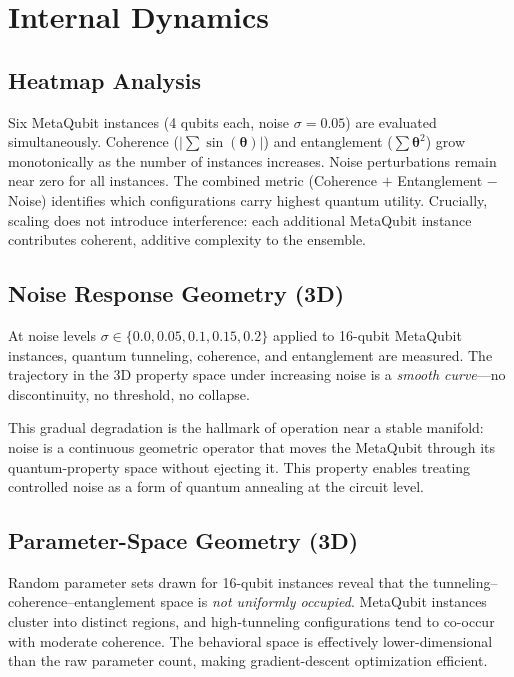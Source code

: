 \documentclass[twocolumn,amsmath,amssymb,prl]{revtex4-2}
\begin{document}
\section{Internal Dynamics}
\label{sec:internal}

\subsection{Heatmap Analysis}

Six MetaQubit instances (4 qubits each, noise $\sigma = 0.05$) are evaluated
simultaneously.  Coherence ($|\sum \sin(\boldsymbol{\theta})|$) and entanglement
($\sum \boldsymbol{\theta}^2$) grow monotonically as the number of instances
increases.  Noise perturbations remain near zero for all instances.  The
combined metric (Coherence $+$ Entanglement $-$ Noise) identifies which
configurations carry highest quantum utility.  Crucially, scaling does not
introduce interference: each additional MetaQubit instance contributes
coherent, additive complexity to the ensemble.

\subsection{Noise Response Geometry (3D)}

At noise levels $\sigma \in \{0.0, 0.05, 0.1, 0.15, 0.2\}$ applied to
16-qubit MetaQubit instances, quantum tunneling, coherence, and entanglement are
measured.  The trajectory in the 3D property space under increasing noise is a
\emph{smooth curve}—no discontinuity, no threshold, no collapse.

This gradual degradation is the hallmark of operation near a stable manifold:
noise is a continuous geometric operator that moves the MetaQubit through its
quantum-property space without ejecting it.  This property enables treating
controlled noise as a form of quantum annealing at the circuit level.

\subsection{Parameter-Space Geometry (3D)}

Random parameter sets drawn for 16-qubit instances reveal that the tunneling–
coherence–entanglement space is \emph{not uniformly occupied}.  MetaQubit
instances cluster into distinct regions, and high-tunneling configurations
tend to co-occur with moderate coherence.  The behavioral space is effectively
lower-dimensional than the raw parameter count, making gradient-descent
optimization efficient.
\end{document}
